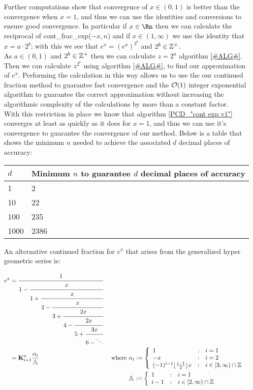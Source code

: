 Further computations show that convergence of \(x \in (0, 1)\) is better than the convergence when \(x=1\), and thus we can use the identities and conversions to ensure good convergence. In particular if \(x \in \Rn\) then we can calculate the reciprocal of \textrm{cont\_frac\_exp(\(-x, n\))} and if \(x \in (1,\infty)\) we use the identity that \(x = a\cdot2^b\); with this we see that \(e^x = (e^a)^{2^b}\) and \(2^b \in \mathbb{Z}^+\).\\

As \(a \in (0,1)\) and \(2^b \in \mathbb{Z}^+\) then we can calculate \(z = 2^a\) algorithm \ref{#ALG#}. Then we can calculate \(z^{2^b}\) using algorithm \ref{#ALG#}, to find our approximation of \(e^x\). Performing the calculation in this way allows us to use the our continued fraction method to guarantee fast convergence and the \(\mathcal{O}(1)\) integer exponential algorithm to guarantee the correct approximation without increasing the algorithmic complexity of the calculations by more than a constant factor.\\

With this restriction in place we know that algorithm \ref{PCD_"cont exp v1"} converges at least as quickly as it does for \(x = 1\), and thus we can use it's convergence to guarantee the convergence of our method. Below is a table that shows the minimum \(n\) needed to achieve the associated \(d\) decimal places of accuracy:

\begin{center}
\begin{tabular}{|l|l|}
\hline
\(d\) & Minimum \(n\) to guarantee \(d\) decimal places of accuracy\\\hline
1 & 2 \\\hline
10 & 22 \\\hline
100 & 235 \\\hline
1000 & 2386 \\\hline
\end{tabular}
\end{center}

An alternative continued fraction for \(e^x\) that arises from the generalized hyper geometric series is:

\begin{align}
e^x &= \cfrac{1}{1 -
	   \cfrac{x}{1 +
	   \cfrac{x}{2 -
	   \cfrac{x}{3 +
	   \cfrac{2x}{4 -
	   \cfrac{2x}{5 +
	   \cfrac{3x}{6 - \ddots} } } } } } } \label{EQN_"exp cont frac 2"}\\
	&= \mathbf{K}_{i=1}^n\frac{\alpha_i}{\beta_i} &\textrm{ where } 
		&\alpha_i := \left\{\begin{array}{lcl}
			1 &:& i = 1\\
			-x &:& i = 2\\
			(-1)^{i-1}\lfloor\frac{i-1}{2}\rfloor x&:&i\in[3,\infty)\cap\mathbb{Z}
			\end{array}\right.\nonumber\\
	&  &&\beta_i := \left\{\begin{array}{lcl}
			1 &:& i=1\\
			i-1 &:& i \in [2, \infty) \cap\mathbb{Z}
			\end{array}\right.\nonumber
\end{align}

